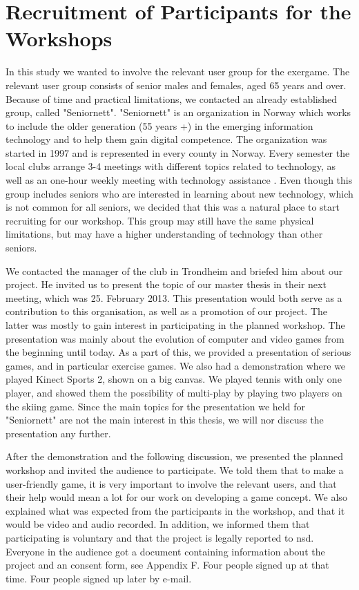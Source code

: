\section{Recruitment of Participants for the Workshops}
\label{sec:recruitment}
In this study we wanted to involve the relevant user group for the exergame. The relevant user group consists of senior males and females, aged 65 years and over. Because of time and practical limitations, we contacted an already established group, called "Seniornett". "Seniornett" is an organization in Norway which works to include the older generation (55 years +) in the emerging information technology and to help them gain digital competence. The organization was started in 1997 and is represented in every county in Norway.  Every semester the local clubs arrange 3-4 meetings with different topics related to technology, as well as an one-hour weekly meeting with technology assistance \cite{seniornett}. Even though this group includes seniors who are interested in learning about new technology, which is not common for all seniors, we decided that this was a natural place to start recruiting for our workshop. This group may still have the same physical limitations, but may have a higher understanding of technology than other seniors. 

We contacted the manager of the club in Trondheim and briefed him about our project. He invited us to present the topic of our master thesis in their next meeting, which was 25. February 2013. This presentation would both serve as a contribution to this organisation, as well as a promotion of our project. The latter was mostly to gain interest in participating in the planned workshop. The presentation was mainly about the evolution of computer and video games from the beginning until today. As a part of this, we provided a presentation of serious games, and in particular exercise games. We also had a demonstration where we played Kinect Sports 2, shown on a big canvas. We played tennis with only one player, and showed them the possibility of multi-play by playing two players on the skiing game. Since the main topics for the presentation we held for "Seniornett" are not the main interest in this thesis, we will nor discuss the presentation any further.

After the demonstration and the following discussion, we presented the planned workshop and invited the audience to participate. We told them that to make a user-friendly game, it is very important to involve the relevant users, and that their help would mean a lot for our work on developing a game concept. We also explained what was expected from the participants in the workshop, and that it would be video and audio recorded. In addition, we informed them that participating is voluntary and that the project is legally reported to \ac{nsd}. Everyone in the audience got a document containing information about the project and an consent form, see Appendix F. Four people signed up at that time. Four people signed up later by e-mail.


